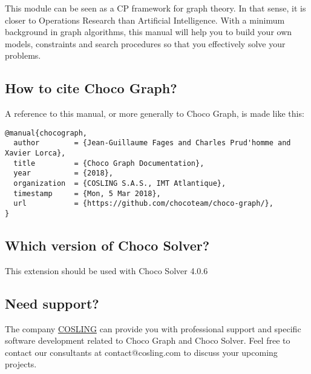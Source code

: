 \documentclass{article}
\begin{document}
This module can be seen as a CP framework for graph theory. In that sense, it is closer to Operations Research than Artificial Intelligence. With a minimum background in graph algorithms, this manual will help you to build your own models, constraints and search procedures so that you effectively solve your problems. 



\subsection{How to cite Choco Graph?}

A reference to this manual, or more generally to Choco Graph, is made like this:
\begin{lstlisting}
@manual{chocograph,
  author        = {Jean-Guillaume Fages and Charles Prud'homme and Xavier Lorca},
  title         = {Choco Graph Documentation},
  year          = {2018},
  organization  = {COSLING S.A.S., IMT Atlantique},
  timestamp     = {Mon, 5 Mar 2018},
  url           = {https://github.com/chocoteam/choco-graph/},
}
\end{lstlisting}

\subsection{Which version of Choco Solver?}

This extension should be used with Choco Solver 4.0.6

\subsection{Need support?}

The company \href{https://www.cosling.com/}{COSLING} can provide you with professional support and specific software development related to Choco Graph and Choco Solver. Feel free to contact our consultants at contact@cosling.com to discuss your upcoming projects.
\end{document}
